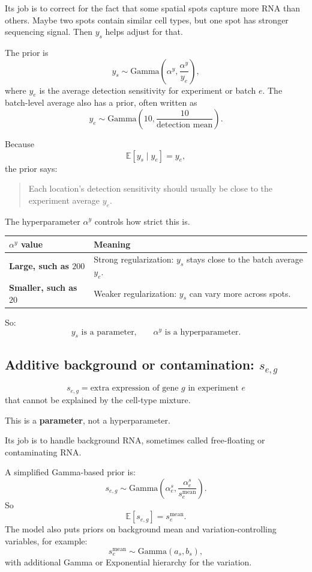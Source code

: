 \documentclass[11pt]{article}
\newcommand{\E}{\mathbb{E}}
\newcommand{\term}[1]{\textbf{#1}}
\begin{document}
Its job is to correct for the fact that some spatial spots capture more RNA than others. Maybe two spots contain similar cell types, but one spot has stronger sequencing signal. Then $y_s$ helps adjust for that.

The prior is
\[
y_s\sim \mathrm{Gamma}\left(\alpha^y,\frac{\alpha^y}{y_e}\right),
\]
where $y_e$ is the average detection sensitivity for experiment or batch $e$. The batch-level average also has a prior, often written as
\[
y_e\sim \mathrm{Gamma}\left(10,\frac{10}{\text{detection mean}}\right).
\]

Because
\[
\E[y_s\mid y_e]=y_e,
\]
the prior says:

\begin{quote}
Each location's detection sensitivity should usually be close to the experiment average $y_e$.
\end{quote}

The hyperparameter $\alpha^y$ controls how strict this is.

\begin{center}
\begin{tabularx}{0.95\textwidth}{>{\bfseries}p{}X}
\toprule
$\alpha^y$ value & Meaning \\
\midrule
Large, such as $200$ & Strong regularization: $y_s$ stays close to the batch average $y_e$. \\
Smaller, such as $20$ & Weaker regularization: $y_s$ can vary more across spots. \\
\bottomrule
\end{tabularx}
\end{center}

So:
\[
y_s\text{ is a parameter,}
\qquad
\alpha^y\text{ is a hyperparameter.}
\]

\subsection{Additive background or contamination: $s_{e,g}$}

\[
s_{e,g}=\text{extra expression of gene }g\text{ in experiment }e
\]
that cannot be explained by the cell-type mixture.

This is a \term{parameter}, not a hyperparameter.

Its job is to handle background RNA, sometimes called free-floating or contaminating RNA.

A simplified Gamma-based prior is:
\[
s_{e,g}\sim \mathrm{Gamma}\left(\alpha^s_e,\frac{\alpha^s_e}{s^{\mathrm{mean}}_e}\right).
\]
So
\[
\E[s_{e,g}]=s^{\mathrm{mean}}_e.
\]
The model also puts priors on background mean and variation-controlling variables, for example:
\[
s^{\mathrm{mean}}_e\sim \mathrm{Gamma}(a_s,b_s),
\]
with additional Gamma or Exponential hierarchy for the variation.
\end{document}

